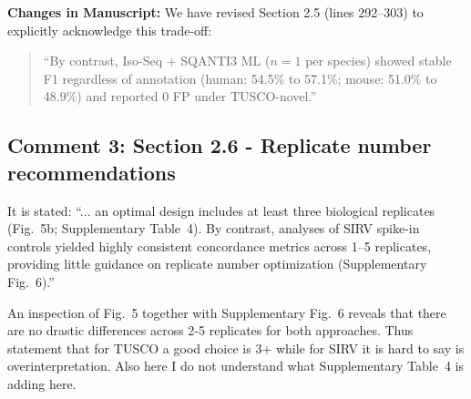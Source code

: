 \documentclass[11pt]{article}
\begin{document}
\begin{responseboxnew}
\vspace{0.3cm}
\textbf{Changes in Manuscript:} We have revised Section 2.5 (lines 292--303) to explicitly acknowledge this trade-off:

\begin{quote}
``By contrast, Iso-Seq + SQANTI3 ML ($n=1$ per species) showed stable F1 regardless of annotation (human: 54.5\% to 57.1\%; mouse: 51.0\% to 48.9\%) and reported 0 FP under TUSCO-novel.''
\end{quote}
\end{responseboxnew}

\subsection{Comment 3: Section 2.6 - Replicate number recommendations}

\begin{reviewercomment}
It is stated: ``... an optimal design includes at least three biological replicates (Fig.~5b; Supplementary Table~4). By contrast, analyses of SIRV spike-in controls yielded highly consistent concordance metrics across 1–5 replicates, providing little guidance on replicate number optimization (Supplementary Fig.~6).''

\vspace{0.2cm}
An inspection of Fig.~5 together with Supplementary Fig.~6 reveals that there are no drastic differences across 2-5 replicates for both approaches. Thus statement that for TUSCO a good choice is 3+ while for SIRV it is hard to say is overinterpretation. Also here I do not understand what Supplementary Table~4 is adding here.
\end{reviewercomment}
\end{document}
